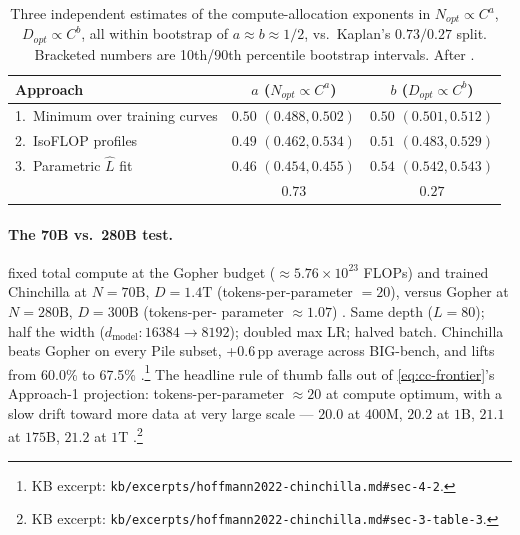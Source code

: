 \begin{table}[h]
\centering
\small
\begin{tabular}{lcc}
\toprule
Approach & $a$ ($N_{opt} \propto C^{a}$) & $b$ ($D_{opt} \propto C^{b}$) \\
\midrule
1.\ Minimum over training curves & $0.50$ \tiny{$(0.488, 0.502)$} & $0.50$ \tiny{$(0.501, 0.512)$} \\
2.\ IsoFLOP profiles             & $0.49$ \tiny{$(0.462, 0.534)$} & $0.51$ \tiny{$(0.483, 0.529)$} \\
3.\ Parametric $\hat{L}$ fit      & $0.46$ \tiny{$(0.454, 0.455)$} & $0.54$ \tiny{$(0.542, 0.543)$} \\
\midrule
\textbf{\citet{kaplan2020}}      & $\mathbf{0.73}$ & $\mathbf{0.27}$ \\
\bottomrule
\end{tabular}
\caption{Three independent estimates of the compute-allocation
exponents in $N_{opt} \propto C^{a}$, $D_{opt} \propto C^{b}$, all
within bootstrap of $a \approx b \approx 1/2$, vs.\ Kaplan's
$0.73/0.27$ split. Bracketed numbers are 10th/90th percentile
bootstrap intervals. After
\citet[\S 3, Table 2]{hoffmann2022-chinchilla}.}
\label{tab:cc-table-2}
\end{table}

\paragraph{The 70B vs.\ 280B test.}
\citet{hoffmann2022-chinchilla} fixed total compute at the Gopher
budget ($\approx 5.76 \times 10^{23}$ FLOPs) and trained Chinchilla at
$N = 70\text{B}$, $D = 1.4\text{T}$ (tokens-per-parameter $= 20$),
versus Gopher at $N = 280\text{B}$, $D = 300\text{B}$ (tokens-per-
parameter $\approx 1.07$) \citep[\S 4.1, Table 4]{hoffmann2022-chinchilla}.
Same depth ($L = 80$); half the width ($d_{\text{model}}: 16384 \to
8192$); doubled max LR; halved batch. Chinchilla beats Gopher on
every Pile subset, +0.6\,pp average across BIG-bench, and lifts 
from 60.0\% to 67.5\% \citep[\S 4.2]{hoffmann2022-chinchilla}.\footnote{KB
excerpt: \nolinkurl{kb/excerpts/hoffmann2022-chinchilla.md#sec-4-2}.}
The headline rule of thumb falls out of \cref{eq:cc-frontier}'s Approach-1
projection: tokens-per-parameter $\approx 20$ at compute optimum, with
a slow drift toward more data at very large scale --- $20.0$ at $400$M,
$20.2$ at $1$B, $21.1$ at $175$B, $21.2$ at $1$T \citep[\S 3, Table
3]{hoffmann2022-chinchilla}.\footnote{KB excerpt:
\nolinkurl{kb/excerpts/hoffmann2022-chinchilla.md#sec-3-table-3}.}

